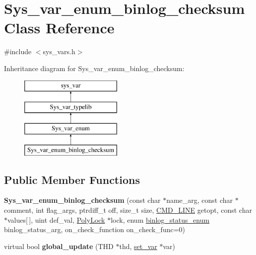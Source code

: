 \hypertarget{classSys__var__enum__binlog__checksum}{}\section{Sys\+\_\+var\+\_\+enum\+\_\+binlog\+\_\+checksum Class Reference}
\label{classSys__var__enum__binlog__checksum}


{\ttfamily \#include $<$sys\+\_\+vars.\+h$>$}

Inheritance diagram for Sys\+\_\+var\+\_\+enum\+\_\+binlog\+\_\+checksum\+:\begin{figure}[H]
\begin{center}
\leavevmode
\includegraphics[height=4.000000cm]{classSys__var__enum__binlog__checksum}
\end{center}
\end{figure}
\subsection*{Public Member Functions}
\begin{DoxyCompactItemize}
\item 
\mbox{\label{classSys__var__enum__binlog__checksum_ae19a69a1decb1170692d9d5c0dc80cb7}} 
{\bfseries Sys\+\_\+var\+\_\+enum\+\_\+binlog\+\_\+checksum} (const char $\ast$name\+\_\+arg, const char $\ast$comment, int flag\+\_\+args, ptrdiff\+\_\+t off, size\+\_\+t size, \mbox{\hyperlink{structCMD__LINE}{C\+M\+D\+\_\+\+L\+I\+NE}} getopt, const char $\ast$values\mbox{[}$\,$\mbox{]}, uint def\+\_\+val, \mbox{\hyperlink{classPolyLock}{Poly\+Lock}} $\ast$lock, enum \mbox{\hyperlink{classsys__var_a664520ec82191888717c86085bfa83ce}{binlog\+\_\+status\+\_\+enum}} binlog\+\_\+status\+\_\+arg, on\+\_\+check\+\_\+function on\+\_\+check\+\_\+func=0)
\item 
\mbox{\label{classSys__var__enum__binlog__checksum_a23daaa3e18c8dc64498275cf619056f4}} 
virtual bool {\bfseries global\+\_\+update} (T\+HD $\ast$thd, \mbox{\hyperlink{classset__var}{set\+\_\+var}} $\ast$var)
\end{DoxyCompactItemize}
